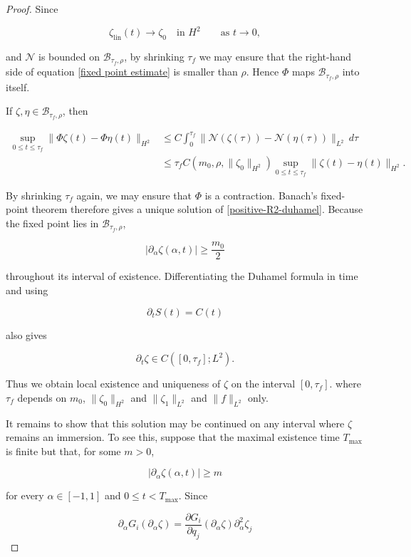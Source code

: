 \documentclass[10pt,a4paper]{amsart}
\begin{document}
\begin{proof}
Since

$$
    \zeta_{\mathrm{lin}}(t)\longrightarrow\zeta_0
    \quad\text{in }H^2
    \qquad\text{as }t\to0,
$$

and \(\mathcal N\) is bounded on \(\mathcal B_{\tau_f,\rho}\), by shrinking \(\tau_f\) we may ensure that the right-hand side of equation \eqref{fixed point estimate} is smaller than \(\rho\). Hence \(\Phi\) maps \(\mathcal B_{\tau_f,\rho}\) into itself.
\newline

If \(\zeta,\eta\in\mathcal B_{\tau_f,\rho}\), then

$$
\begin{aligned}
    \sup_{0\leq t\leq \tau_f}
    \|\Phi\zeta(t)-\Phi\eta(t)\|_{H^2}
    &\leq
    C\int_0^{\tau_f}
    \|
        \mathcal N(\zeta(\tau))
        -
        \mathcal N(\eta(\tau))
    \|_{L^2}\,d\tau\\
    &\leq
    \tau_fC(m_0,\rho,\|\zeta_0\|_{H^2})
    \sup_{0\leq t\leq \tau_f}
    \|\zeta(t)-\eta(t)\|_{H^2}.
\end{aligned}
$$

By shrinking \(\tau_f\) again, we may ensure that \(\Phi\) is a contraction. Banach's fixed-point theorem therefore gives a unique solution of \eqref{positive-R2-duhamel}. Because the fixed point lies in \(\mathcal B_{\tau_f,\rho}\),

$$
    |\partial_\alpha\zeta(\alpha,t)|
    \geq\frac{m_0}{2}
$$

throughout its interval of existence. Differentiating the Duhamel formula in time and using

$$
    \partial_tS(t)=C(t)
$$

also gives

$$
    \partial_t\zeta\in C([0,\tau_f];L^2).
$$

Thus we obtain local existence and uniqueness of $\zeta$ on the interval $[0,\tau_f]$. where $\tau_f$ depends on $m_0$, $\|\zeta_0\|_{H^2}$ and $\|\zeta_1\|_{L^2}$ and $\|f\|_{L^2}$ only.
\newline 

It remains to show that this solution may be continued on any interval where $\zeta$ remains an immersion. To see this, suppose that the maximal existence time \(T_{\max}\) is finite but that, for some \(m>0\),

$$
    |\partial_\alpha\zeta(\alpha,t)|\geq m
$$

for every \(\alpha\in[-1,1]\) and \(0\leq t<T_{\max}\). Since

$$
    \partial_\alpha G_i(\partial_\alpha\zeta)
    =
    \frac{\partial G_i}{\partial q_j}
        (\partial_\alpha\zeta)
    \partial_\alpha^2\zeta_j
$$


\end{proof}
\end{document}
